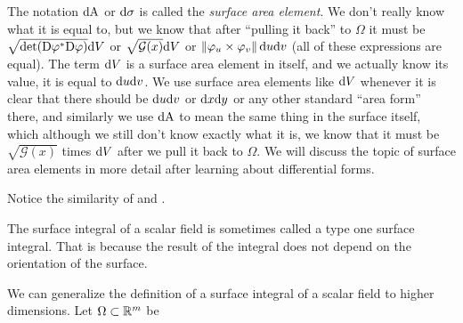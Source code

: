 \documentclass[11pt,a4paper]{article}
\begin{document}
\begin{remark}
  \label{rmk:surface-area-element-first-discovery}
  The notation $\mathrm{d} \mathrm{A}$ or $\mathrm{d} \sigma$ is called the \textit{surface area
  element}.
  We don't really know what it is equal to,
  but we know that after ``pulling it back'' to $\Omega$
  it must be $\sqrt{\det(\mathrm{D} \varphi^* \mathrm{D} \varphi)} \mathrm{d} V$
  or $\sqrt{\mathcal G(x)} \mathrm{d} V$ or $\left\lVert\varphi_u \times \varphi_v\right\rVert \mathrm{d} u \mathrm{d} v$
  (all of these expressions are equal).
  The term $\mathrm{d} V$ is a surface area element in itself,
  and we actually know its value, it is equal to $\mathrm{d} u \mathrm{d} v$.
  We use surface area elements like $\mathrm{d} V$ whenever it is clear
  that there should be $\mathrm{d} u \mathrm{d} v$ or $\dx \dy$ or any other
  standard ``area form'' there,
  and similarly we use $\mathrm{d} \mathrm{A}$ to mean the same thing in the surface
  itself, which although we still don't know
  exactly what it is,
  we know that it must be $\sqrt{\mathcal G(x)}$ times $\mathrm{d} V$
  after we pull it back to $\Omega$.
  We will discuss the topic of surface area elements
  in more detail after learning about differential forms.
\end{remark}

\begin{remark}
  Notice the similarity of 
  and .
\end{remark}

\begin{remark}
  The surface integral of a scalar field is sometimes called a type one
  surface integral.
  That is because the result of the integral does not depend on the
  orientation of the surface.
\end{remark}

\begin{definition}
  We can generalize the definition of a surface integral of a scalar
  field to higher dimensions.
  Let $\Omega \subset \mathbb{R}^m$ be 
\end{definition}
\end{document}
